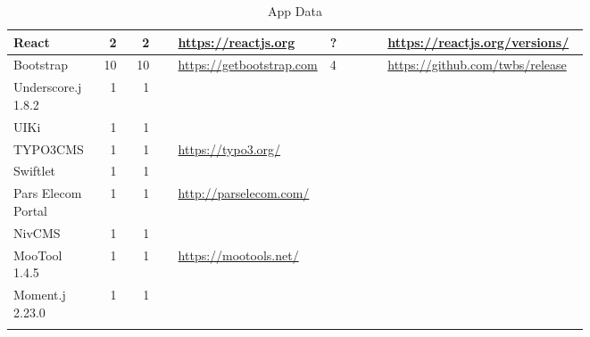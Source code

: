 \begin{landscape}
\begin{longtable}{|p{0.1\linewidth}|r|r|r|p{0.2\linewidth}|p{0.1\linewidth}|p{0.35\linewidth}|}
		React &2 &2 & &\url{https://reactjs.org} &? &\url{https://reactjs.org/versions/} \\\hline
		Bootstrap &10 &10 & &\url{https://getbootstrap.com} &4 &\url{https://github.com/twbs/release} \\\hline
		Underscore.j 1.8.2 &1 &1 & & & & \\\hline
		UIKi &1 &1 & & & & \\\hline
		TYPO3CMS &1 &1 & &\url{https://typo3.org/} & & \\\hline
		Swiftlet &1 &1 & & & & \\\hline
		Pars Elecom Portal &1 &1 & &\url{http://parselecom.com/} & & \\\hline
		NivCMS &1 &1 & & & & \\\hline
		MooTool 1.4.5 &1 &1 & &\url{https://mootools.net/} & & \\\hline
		Moment.j 2.23.0 &1 &1 & & & & \\\hline
		\bottomrule
		\caption{App Data}\label{tab: }
	\end{longtable}
\end{landscape}
